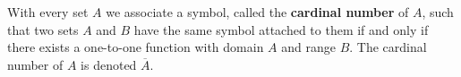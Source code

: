 With every set \(A\) we associate a symbol, called the \textbf{cardinal number} of \(A\), such that two sets \(A\) and \(B\) have the same symbol attached to them if and only if there exists a one-to-one function with domain \(A\) and range \(B\). The cardinal number of \(A\) is denoted \(\overline{A}\).